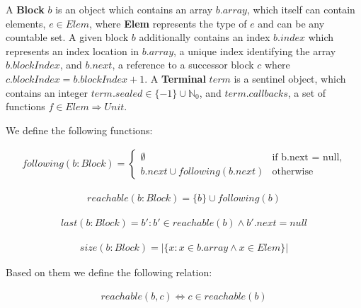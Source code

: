\begin{definitiontwo}
A \textbf{Block} $b$ is an object which
contains an array $b.array$, which itself can contain elements, $e \in Elem$,
where \textbf{Elem} represents the type of $e$ and can be any countable set. A
given block $b$ additionally contains an index $b.index$ which represents an
index location in $b.array$, a unique index identifying the array
$b.blockIndex$, and $b.next$, a reference to a successor block $c$ where
$c.blockIndex = b.blockIndex + 1$. A \textbf{Terminal} $term$ is a sentinel
object, which contains an integer $term.sealed \in \{-1\} \cup \mathbb{N}_0$, and
$term.callbacks$, a set of functions $f \in Elem \Rightarrow Unit$.

We define the following functions:

\begin{align*}
following(b: Block) =
\begin{cases}
\emptyset & \text{if b.next = null,}
\\
b.next \cup following(b.next) & \text{otherwise}
\end{cases}
\end{align*}

\vspace{-1cm}
\begin{align*}
reachable(b: Block) = \{ b \} \cup following(b)
\end{align*}

\vspace{-1cm}
\begin{align*}
last(b: Block) = b' : b' \in reachable(b) \wedge b'.next = null
\end{align*}

\vspace{-1cm}
\begin{align*}
size(b: Block) = | \{ x : x \in b.array \wedge x \in Elem \} |
\end{align*}

Based on them we define the following relation:

\vspace{-0.7cm}
\begin{align*}
reachable(b, c) \Leftrightarrow c \in reachable(b)
\end{align*}
\end{definitiontwo}

